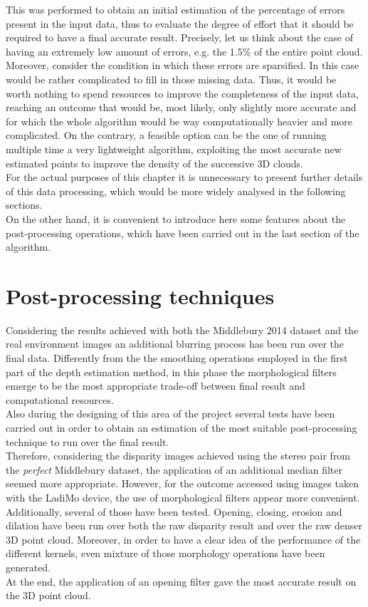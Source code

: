 This was performed to obtain an initial estimation of the percentage of errors present in the input data, thus to evaluate the degree of effort that it should be required to have a final accurate result.
Precisely, let us think about the case of having an extremely low amount of errors, e.g. the 1.5\% of the entire point cloud. 
Moreover, consider the condition in which these errors are sparsified.
In this case would be rather complicated to fill in those missing data.
Thus, it would be worth nothing to spend resources to improve the completeness of the input data, reaching an outcome that would be, most likely, only slightly more accurate and for which the whole algorithm would be way computationally heavier and more complicated. 
On the contrary, a feasible option can be the one of running multiple time a very lightweight algorithm, exploiting the most accurate new estimated points to improve the density of the successive 3D clouds.\\
For the actual purposes of this chapter it is unnecessary to present further details of this data processing, which would be more widely analysed in the following sections. \\
On the other hand, it is convenient to introduce here some features about the post-processing operations, which have been carried out in the last section of the algorithm.

\section{Post-processing techniques}
\label{section:post-process-tech}

Considering the results achieved with both the Middlebury 2014 dataset and the real environment images an additional blurring process has been run over the final data. 
Differently from the the smoothing operations employed in the first part of the depth estimation method, in this phase the morphological filters emerge to be the most appropriate trade-off between final result and computational resources. \\
Also during the designing of this area of the project several tests have been carried out in order to obtain an estimation of the most suitable post-processing technique to run over the final result.\\
Therefore, considering the disparity images achieved using the stereo pair from the \textit{perfect} Middlebury dataset, the application of an additional median filter seemed more appropriate.
However, for the outcome accessed using images taken with the LadiMo device, the use of morphological filters appear more convenient. 
Additionally, several of those have been tested. 
Opening, closing, erosion and dilation have been run over both the raw disparity result and over the raw denser 3D point cloud.
Moreover, in order to have a clear idea of the performance of the different kernels, even mixture of those morphology operations have been generated. \\
At the end, the application of an opening filter gave the most accurate result on the 3D point cloud. 
